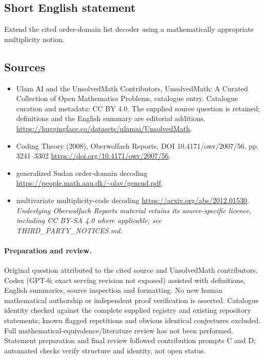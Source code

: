 \documentclass[11pt]{article}
\begin{document}
\subsection{Short English statement}
Extend the cited order-domain list decoder using a mathematically appropriate multiplicity notion.
\subsection{Sources}
\begin{itemize}
\item[\hypertarget{source:statement:1}{S1}] Ulam AI and the UnsolvedMath Contributors, UnsolvedMath: A Curated Collection of Open Mathematics Problems, catalogue entry. Catalogue curation and metadata: CC BY 4.0. The supplied source question is retained; definitions and the English summary are editorial additions.
\url{https://huggingface.co/datasets/ulamai/UnsolvedMath}.
\item[\hypertarget{source:statement:2}{S2}] Coding Theory (2008), Oberwolfach Reports, DOI 10.4171/owr/2007/56, pp. 3241--3302
\url{https://doi.org/10.4171/owr/2007/56}.
\item[\hypertarget{source:statement:3}{S3}] generalized Sudan order-domain decoding
\url{https://people.math.aau.dk/~olav/gensud.pdf}.
\item[\hypertarget{source:statement:4}{S4}] multivariate multiplicity-code decoding
\url{https://arxiv.org/abs/2012.01530}.
\textit{Underlying Oberwolfach Reports material retains its source-specific licence, including CC BY-SA 4.0 where applicable; see THIRD\_PARTY\_NOTICES.md.}
\end{itemize}
\paragraph{Preparation and review.}
Original question attributed to the cited source and UnsolvedMath contributors. Codex (GPT-6; exact serving revision not exposed) assisted with definitions, English summaries, source inspection and formatting. No new human mathematical authorship or independent proof verification is asserted. Catalogue identity checked against the complete supplied registry and existing repository statements; known flagged repetitions and obvious identical conjectures excluded. Full mathematical-equivalence/literature review has not been performed. Statement preparation and final review followed contribution prompts C and D; automated checks verify structure and identity, not open status.
\label{end:statement}
\end{document}
